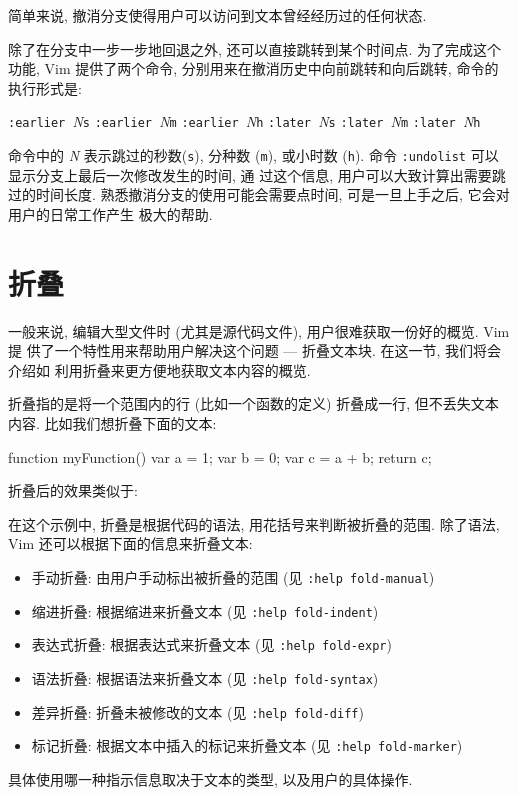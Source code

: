简单来说, 撤消分支使得用户可以访问到文本曾经经历过的任何状态.

除了在分支中一步一步地回退之外, 还可以直接跳转到某个时间点. 为了完成这个功能,
Vim 提供了两个命令, 分别用来在撤消历史中向前跳转和向后跳转, 命令的执行形式是:
\begin{vimcmdform}
\texttt{:earlier }\textit{N}\texttt{s}
\texttt{:earlier }\textit{N}\texttt{m}
\texttt{:earlier }\textit{N}\texttt{h}
\texttt{:later }\textit{N}\texttt{s}
\texttt{:later }\textit{N}\texttt{m}
\texttt{:later }\textit{N}\texttt{h}
\end{vimcmdform}
命令中的 \textit{N} 表示跳过的秒数(\texttt{s}), 分种数 (\texttt{m}), 或小时数
(\texttt{h}). 命令 \texttt{:undolist} 可以显示分支上最后一次修改发生的时间, 通
过这个信息, 用户可以大致计算出需要跳过的时间长度.
熟悉撤消分支的使用可能会需要点时间, 可是一旦上手之后, 它会对用户的日常工作产生
极大的帮助.

\section{折叠}
\label{sec:folding}

一般来说, 编辑大型文件时 (尤其是源代码文件), 用户很难获取一份好的概览. Vim 提
供了一个特性用来帮助用户解决这个问题 --- 折叠文本块. 在这一节, 我们将会介绍如
利用折叠来更方便地获取文本内容的概览.

折叠指的是将一个范围内的行 (比如一个函数的定义) 折叠成一行, 但不丢失文本内容.
比如我们想折叠下面的文本:
\begin{vimcode}
function myFunction() {
    var a = 1;
    var b = 0;
    var c = a + b;
    return c;
}
\end{vimcode}
折叠后的效果类似于:
\begin{vimcode}
+-- 6 lines: function myFunction() { ----------------------------
\end{vimcode}
在这个示例中, 折叠是根据代码的语法, 用花括号来判断被折叠的范围. 除了语法, Vim
还可以根据下面的信息来折叠文本:
\begin{itemize}
    \item 手动折叠: 由用户手动标出被折叠的范围 (见 \texttt{:help fold-manual})
    \item 缩进折叠: 根据缩进来折叠文本 (见 \texttt{:help fold-indent})
    \item 表达式折叠: 根据表达式来折叠文本 (见 \texttt{:help fold-expr})
    \item 语法折叠: 根据语法来折叠文本 (见 \texttt{:help fold-syntax})
    \item 差异折叠: 折叠未被修改的文本 (见 \texttt{:help fold-diff})
    \item 标记折叠: 根据文本中插入的标记来折叠文本 (见
        \texttt{:help fold-marker})
\end{itemize}
具体使用哪一种指示信息取决于文本的类型, 以及用户的具体操作.

